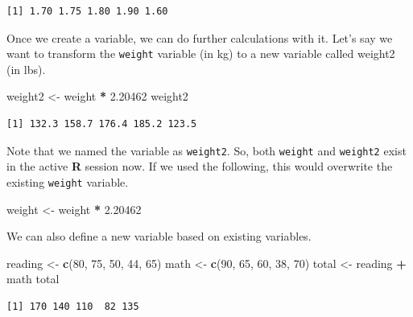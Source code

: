 \documentclass[]{book}
\newenvironment{Shaded}{\begin{snugshade}}{\end{snugshade}}
\newcommand{\DecValTok}[1]{\textcolor[rgb]{0.00,0.00,0.81}{#1}}
\newcommand{\FloatTok}[1]{\textcolor[rgb]{0.00,0.00,0.81}{#1}}
\newcommand{\KeywordTok}[1]{\textcolor[rgb]{0.13,0.29,0.53}{\textbf{#1}}}
\newcommand{\NormalTok}[1]{#1}
\newcommand{\OperatorTok}[1]{\textcolor[rgb]{0.81,0.36,0.00}{\textbf{#1}}}
\newcommand{\StringTok}[1]{\textcolor[rgb]{0.31,0.60,0.02}{#1}}
\begin{document}
\begin{verbatim}
[1] 1.70 1.75 1.80 1.90 1.60
\end{verbatim}

Once we create a variable, we can do further calculations with it. Let's say we want to transform the \texttt{weight} variable (in kg) to a new variable called weight2 (in lbs).

\begin{Shaded}
\begin{Highlighting}[]
\NormalTok{weight2 <-}\StringTok{ }\NormalTok{weight }\OperatorTok{*}\StringTok{ }\FloatTok{2.20462}
\NormalTok{weight2}
\end{Highlighting}
\end{Shaded}

\begin{verbatim}
[1] 132.3 158.7 176.4 185.2 123.5
\end{verbatim}

Note that we named the variable as \texttt{weight2}. So, both \texttt{weight} and \texttt{weight2} exist in the active \textbf{R} session now. If we used the following, this would overwrite the existing \texttt{weight} variable.

\begin{Shaded}
\begin{Highlighting}[]
\NormalTok{weight <-}\StringTok{ }\NormalTok{weight }\OperatorTok{*}\StringTok{ }\FloatTok{2.20462}
\end{Highlighting}
\end{Shaded}

We can also define a new variable based on existing variables.

\begin{Shaded}
\begin{Highlighting}[]
\NormalTok{reading <-}\StringTok{ }\KeywordTok{c}\NormalTok{(}\DecValTok{80}\NormalTok{, }\DecValTok{75}\NormalTok{, }\DecValTok{50}\NormalTok{, }\DecValTok{44}\NormalTok{, }\DecValTok{65}\NormalTok{)}
\NormalTok{math <-}\StringTok{ }\KeywordTok{c}\NormalTok{(}\DecValTok{90}\NormalTok{, }\DecValTok{65}\NormalTok{, }\DecValTok{60}\NormalTok{, }\DecValTok{38}\NormalTok{, }\DecValTok{70}\NormalTok{)}
\NormalTok{total <-}\StringTok{ }\NormalTok{reading }\OperatorTok{+}\StringTok{ }\NormalTok{math}
\NormalTok{total}
\end{Highlighting}
\end{Shaded}

\begin{verbatim}
[1] 170 140 110  82 135
\end{verbatim}
\end{document}
